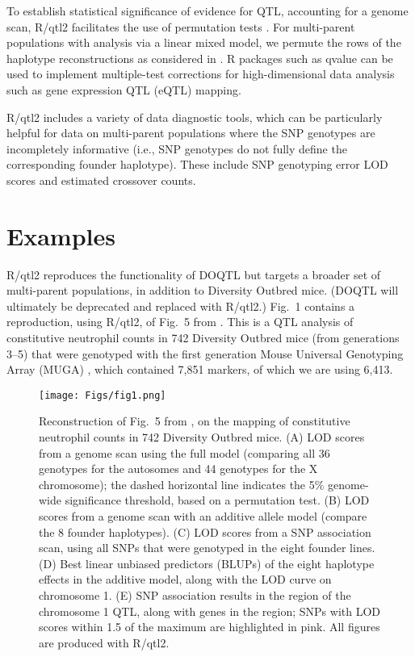 \documentclass[12pt,letterpaper]{article}
\begin{document}
To establish statistical significance of evidence for QTL, accounting
for a genome scan, R/qtl2 facilitates the use of permutation tests
\citep{churchill1994}. For multi-parent populations with analysis via
a linear mixed model, we permute the rows of the haplotype reconstructions as
considered in \citet{cheng2013}.
R packages such as qvalue \citep{qvalue}  can be used to
implement multiple-test corrections for high-dimensional data analysis
\citep{storey2002,storey2003} such as gene expression QTL (eQTL) mapping.

R/qtl2 includes a variety of data diagnostic tools, which can be
particularly helpful for data on multi-parent populations where
the SNP genotypes are incompletely informative
(i.e., SNP genotypes do not fully define the corresponding founder haplotype).
These include SNP
genotyping error LOD scores \citep{Lincoln1992} and estimated
crossover counts.

\clearpage
\section*{Examples}

R/qtl2 reproduces the functionality of DOQTL \citep{gatti2014} but
targets a broader set of multi-parent populations, in addition to
Diversity Outbred mice.
(DOQTL will ultimately be deprecated and replaced with R/qtl2.)
Fig.~1 contains a reproduction, using
R/qtl2, of Fig.~5 from \citet{gatti2014}. This is a QTL analysis of
constitutive neutrophil counts in 742 Diversity Outbred mice (from
generations 3--5) that were genotyped with the first generation Mouse
Universal Genotyping Array (MUGA) \citep{gigamuga}, which contained
7,851 markers, of which we are using 6,413.

\begin{figure}
  \texttt{[image: Figs/fig1.png]}
  \caption{Reconstruction of Fig.~5 from \citet{gatti2014}, on the
    mapping of constitutive neutrophil counts in 742 Diversity Outbred
    mice. (A) LOD scores from a genome scan using the full model
    (comparing all 36 genotypes for the autosomes and 44 genotypes for
    the X chromosome); the dashed horizontal line indicates the 5\%
    genome-wide significance threshold, based on a permutation test.
    (B) LOD scores from a genome scan with an additive allele model
    (compare the 8 founder haplotypes). (C) LOD scores from a SNP
    association scan, using all SNPs that were genotyped in the eight
    founder lines. (D) Best linear unbiased predictors (BLUPs) of the
    eight haplotype effects in the additive model, along with the LOD
    curve on chromosome 1. (E) SNP association results in the region
    of the chromosome 1 QTL, along with genes in the region; SNPs with
    LOD scores within 1.5 of the maximum are highlighted in pink.
  All figures are produced with R/qtl2.}
\end{figure}
\end{document}
